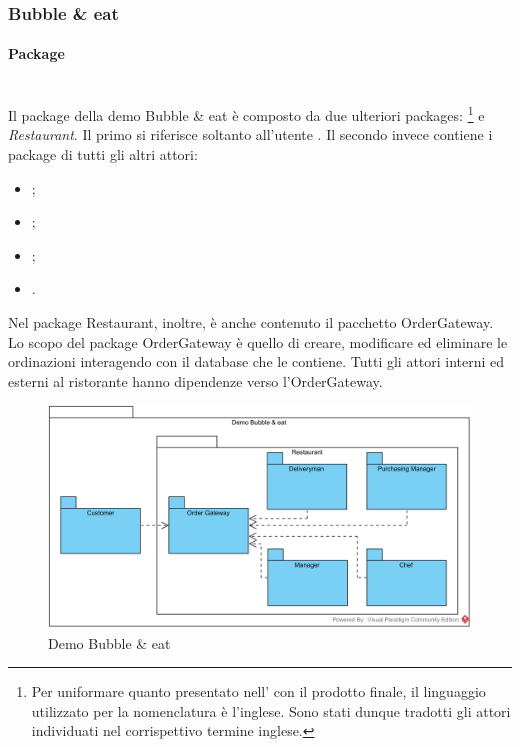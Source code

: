 \subsubsection{Bubble \& eat} \label{bubbleeat}

\paragraph{Package}\mbox{}\\
Il package della demo Bubble \& eat è composto da due ulteriori packages: \Customer{}\footnote{Per uniformare quanto presentato nell'\AnalisiDeiRequisiti{} con il prodotto finale, il linguaggio utilizzato per la nomenclatura è l'inglese. Sono stati dunque tradotti gli attori individuati nel corrispettivo termine inglese.} e \textit{Restaurant}. 
Il primo si riferisce soltanto all'utente \Customer{}. Il secondo invece contiene i package di tutti gli altri attori:
\begin{itemize}
	\item \Manager{};
	\item \Chef{};
	\item \Deliveryman{};
	\item \Purchasingmanager{}.
\end{itemize}
Nel package Restaurant, inoltre, è anche contenuto il pacchetto Order\-Gateway.\\
Lo scopo del package Order\-Gateway è quello di creare, modificare ed eliminare le ordinazioni interagendo con il database che le contiene.
Tutti gli attori interni ed esterni al ristorante hanno dipendenze verso l'Order\-Gateway.
\begin{figure}[H]
	\centering
	\includegraphics[width=14cm]{diagrammi_img/classi_e_package/demo_packages.png}
	\caption{Demo Bubble \& eat}
\end{figure}

